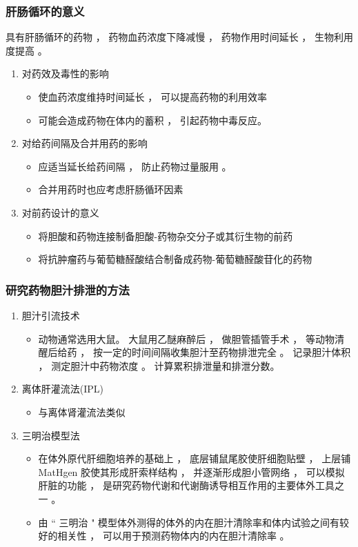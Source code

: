 \documentclass[dvipsnames, svgnames, x11names]{beamer}
\begin{document}
\begin{frame}
    \frametitle{肝肠循环的意义}
    具有肝肠循环的药物 ， 药物血药浓度下降减慢 ， 药物作用时间延长 ， 生物利用度提高 。
    \begin{enumerate}
      \item 对药效及毒性的影响
        \begin{itemize}
          \item 使血药浓度维持时间延长 ， 可以提高药物的利用效率
          \item 可能会造成药物在体内的蓄积 ， 引起药物中毒反应。
        \end{itemize}
      \item 对给药间隔及合并用药的影响
        \begin{itemize}
          \item 应适当延长给药间隔 ， 防止药物过量服用 。
          \item 合并用药时也应考虑肝肠循环因素
        \end{itemize}
      \item 对前药设计的意义
        \begin{itemize}
          \item 将胆酸和药物连接制备胆酸-药物杂交分子或其衍生物的前药
          \item 将抗肿瘤药与葡萄糖醛酸结合制备成药物-葡萄糖醛酸苷化的药物
        \end{itemize}
    \end{enumerate}
\end{frame}


\begin{frame}
    \frametitle{研究药物胆汁排泄的方法}
    \begin{enumerate}
      \item 胆汁引流技术
        \begin{itemize}
          \item 动物通常选用大鼠。 大鼠用乙醚麻醉后 ， 做胆管插管手术 ， 等动物清醒后给药 ， 按一定的时间间隔收集胆汁至药物排泄完全 。 记录胆汁体积 ， 测定胆汁中药物浓度 。 计算累积排泄量和排泄分数。
        \end{itemize}
        \item 离体肝灌流法(IPL)
        \begin{itemize}
            \item 与离体肾灌流法类似
        \end{itemize}
      \item 三明治模型法
        \begin{itemize}
          \item 在体外原代肝细胞培养的基础上 ， 底层铺鼠尾胶使肝细胞贴壁 ， 上层铺 MatHgen 胶使其形成肝索样结构 ， 并逐渐形成胆小管网络 ， 可以模拟肝脏的功能 ， 是研究药物代谢和代谢酶诱导相互作用的主要体外工具之一 。
          \item  由 “ 三明治 " 模型体外测得的体外的内在胆汁清除率和体内试验之间有较好的相关性 ， 可以用于预测药物体内的内在胆汁清除率 。
        \end{itemize}
    \end{enumerate}
\end{frame}
\end{document}
